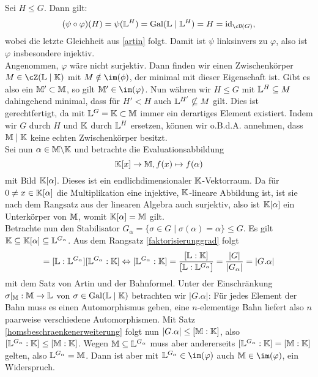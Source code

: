 \begin{beweis}
Sei $H \leq G$. Dann gilt:
\begin{equation}
(\psi \circ \varphi)(H)=\psi(\L^H) = \Gal(\L \mid \L^H) = H = \id_{\cU(G)},
\end{equation}
wobei die letzte Gleichheit aus \ref{artin} folgt. Damit ist $\psi$ linksinvers zu $\varphi$, also ist $\varphi$ insbesondere injektiv.\\
Angenommen, $\varphi$ wäre nicht surjektiv. Dann finden wir einen Zwischenkörper $M \in \cZ(\L \mid \K)$ mit $M \notin \im(\phi)$, der minimal mit dieser Eigenschaft ist. Gibt es also ein $\mathbb{M}' \subset \mathbb{M}$, so gilt $\M' \in \im(\varphi)$. Nun währen wir $H \leq G$ mit $\mathbb{L}^H \subseteq M$ dahingehend minimal, dass für $H'<H$ auch $\mathbb{L}^{H'} \nsubseteq M$ gilt. Dies ist gerechtfertigt, da mit $\mathbb{L}^G = \mathbb{K} \subset \mathbb{M}$ immer ein derartiges Element existiert. Indem wir $G$ durch $H$ und $\mathbb{K}$ durch $\mathbb{L}^H$ ersetzen, können wir o.B.d.A. annehmen, dass $\mathbb{M} \mid \mathbb{K}$ keine echten Zwischenkörper besitzt.\\
Sei nun $\alpha \in \mathbb{M} \backslash \mathbb{K}$ und betrachte die Evaluationsabbildung
\begin{equation}
\mathbb{K}[x] \to \mathbb{M}, f(x) \mapsto f(\alpha)
\end{equation}
mit Bild $\mathbb{K}[\alpha]$. Dieses ist ein endlichdimensionaler $\mathbb{K}$-Vektorraum. Da für $0\neq x \in \mathbb{K}[\alpha]$ die Multiplikation eine injektive, $\mathbb{K}$-lineare Abbildung ist, ist sie nach dem Rangsatz aus der linearen Algebra auch surjektiv, also ist $\mathbb{K}[\alpha]$ ein Unterkörper von $\mathbb{M}$, womit $\mathbb{K}[\alpha]=\mathbb{M}$ gilt.\\
Betrachte nun den Stabilisator $G_\alpha = \{\sigma \in G \mid \sigma(\alpha)=\alpha\} \leq G$. Es gilt $\mathbb{K} \subseteq \mathbb{K}[\alpha] \subseteq \mathbb{L}^{G_\alpha}$. Aus dem Rangsatz \ref{faktorisierunggrad} folgt
\begin{equation}
[\L:\K] = [\L:\L^{G_\alpha}][\L^{G_\alpha} : \K] \iff [\L^{G_\alpha} :\K] = \frac{[\L:\K]}{[\L:\L^{G_\alpha}]} = \frac{|G|}{|G_\alpha|} = |G.\alpha|
\end{equation}
mit dem Satz von Artin und der Bahnformel. Unter der Einschränkung $\sigma|_{\mathbb{M}}: \mathbb{M} \to \mathbb{L}$ von $\sigma \in \operatorname{\text{Gal}}(\mathbb{L} \mid \mathbb{K})$ betrachten wir $|G.\alpha|$: Für jedes Element der Bahn muss es einen Automorphismus geben, eine $n$-elementige Bahn liefert also $n$ paarweise verschiedene Automorphismen. Mit Satz \ref{homsbeschraenkenerweiterung} folgt nun $|G.\alpha| \leq [\mathbb{M} : \mathbb{K}]$, also $[\mathbb{L}^{G_\alpha}:\mathbb{K}] \leq [\mathbb{M} : \mathbb{K}]$. Wegen $\mathbb{M} \subseteq \mathbb{L}^{G_\alpha}$ muss aber andererseits $[\mathbb{L}^{G_\alpha} : \mathbb{K}] = [\mathbb{M} : \mathbb{K}]$ gelten, also $\mathbb{L}^{G_\alpha}=\mathbb{M}$. Dann ist aber mit $\L^{G_\alpha} \in \im(\varphi)$ auch $\M \in \im(\varphi)$, ein Widerspruch.
\end{beweis}
